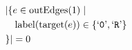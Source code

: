 \begin{align*}
&|\{e \in \mathrm{outEdges}(1)  \mid \\
&\quad \mathrm{label}(\mathrm{target}(e)) \in \{ \text{`\texttt{0}'},  \text{`\texttt{R}'} \}\\
&\}| = 0
\end{align*}

